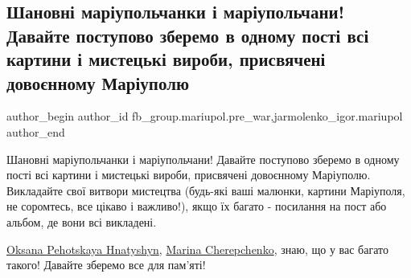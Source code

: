  
 
 
 
 

\subsection{Шановні маріупольчанки і маріупольчани! Давайте поступово зберемо в одному пості всі картини і мистецькі вироби, присвячені довоєнному Маріуполю}
\label{sec:12_02_2023.fb.fb_group.mariupol.pre_war.2.shanovn__mar_upolcha}
 
\ifcmt
 author_begin
   author_id fb_group.mariupol.pre_war,jarmolenko_igor.mariupol
 author_end
\fi

Шановні маріупольчанки і маріупольчани! Давайте поступово зберемо в одному
пості всі картини і мистецькі вироби, присвячені довоєнному Маріуполю.
Викладайте свої витвори мистецтва (будь-які ваші малюнки, картини Маріуполя, не
соромтесь, все цікаво і важливо!), якщо їх багато - посилання на пост або
альбом, де вони всі викладені. 

\href{https://www.facebook.com/profile.php?id=100006825902516}{Oksana Pehotskaya Hnatyshyn}, 
\href{https://www.facebook.com/profile.php?id=100083538824017}{Marina Cherepchenko}, знаю, що у вас багато такого!
Давайте зберемо все для пам'яті!

